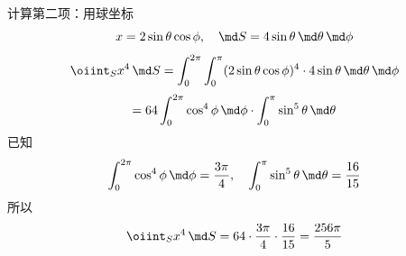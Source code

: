 \begin{example}[向量微分符咒综合应用]
\begin{enumerate}
              计算第二项：用球坐标
              \begin{equation}
                  x = 2\sin\theta\cos\phi,\quad \md S = 4\sin\theta \, \md\theta \, \md\phi
              \end{equation}
              \begin{equation}
                  \oiint_S x^4 \, \md S = \int_0^{2\pi} \int_0^{\pi} (2\sin\theta\cos\phi)^4 \cdot 4\sin\theta \, \md\theta \, \md\phi
              \end{equation}
              \begin{equation}
                  = 64 \int_0^{2\pi} \cos^4\phi \, \md\phi \cdot \int_0^{\pi} \sin^5\theta \, \md\theta
              \end{equation}
              已知
              \begin{equation}
                  \int_0^{2\pi} \cos^4\phi \, \md\phi = \frac{3\pi}{4},\quad
                  \int_0^{\pi} \sin^5\theta \, \md\theta = \frac{16}{15}
              \end{equation}
              所以
              \begin{equation}
                  \oiint_S x^4 \, \md S = 64 \cdot \frac{3\pi}{4} \cdot \frac{16}{15} = \frac{256\pi}{5}
              \end{equation}


\end{enumerate}
\end{example}
